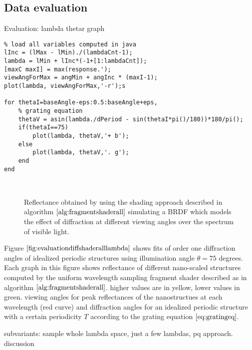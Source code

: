 \subsection{Data evaluation}

\begin{algorithm}[H]
\caption{Evaluation: lambda thetar graph}
\label{alg:evalmatlab}
\begin{lstlisting}
% load all variables computed in java
lInc = (lMax - lMin)./(lambdaCnt-1);
lambda = lMin + lInc*(-1+[1:lambdaCnt]);
[maxC maxI] = max(response.');
viewAngForMax = angMin + angInc * (maxI-1);
plot(lambda, viewAngForMax,'-r');s

for thetaI=baseAngle-eps:0.5:baseAngle+eps,
	% grating equation
	thetaV = asin(lambda./dPeriod - sin(thetaI*pi()/180))*180/pi();
	if(thetaI==75)
		plot(lambda, thetaV,'+ b');
	else
		plot(lambda, thetaV,'. g');
	end
end

\end{lstlisting}
\end{algorithm}





\begin{figure}[H]
  \centering
~
~

  \caption{Reflectance obtained by using the shading approach described in algorithm $\ref{alg:fragmentshaderall}$ simulating a BRDF which models the effect of diffraction at different viewing angles over the spectrum of visible light.}

\label{fig:evaluationdiffshaderalllambda}
\end{figure}

Figure $\ref{fig:evaluationdiffshaderalllambda}$ shows fits of order one diffraction angles of idealized periodic structures using illumination angle $\theta = 75$ degrees. Each graph in this figure shows reflectance of different nano-scaled structures computed by the uniform wavelength sampling fragment shader described as in algorithm $\ref{alg:fragmentshaderall}$. higher values are in yellow, lower values in green. viewing angles for peak reflectances of the nanostructues at each wavelength (red curve) and diffraction angles for an idealized periodic structure with a certain periodicity $T$ according to the grating equation $\ref{eq:gratingeq}$.


subvariants: sample whole lambda space, just a few lambdas, pq approach.
discussion
